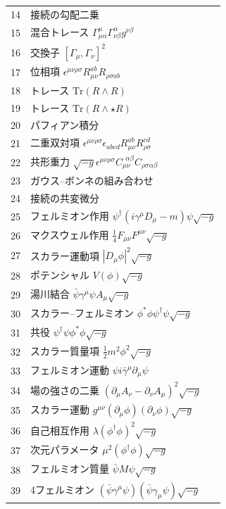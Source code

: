 \documentclass[13pt,a4paper]{ltjsarticle}
\begin{document}
\begin{longtable}{r l}
		14 & 接続の勾配二乗 \\
		15 & 混合トレース \(\Gamma^{\mu}_{\mu\alpha}\Gamma^{\alpha}_{\nu\beta}g^{\nu\beta}\) \\
		16 & 交換子 \([\Gamma_\mu, \Gamma_\nu]^2\) \\
		17 & 位相項 \(\epsilon^{\mu\nu\rho\sigma}R_{\mu\nu}^{ab}R_{\rho\sigma ab}\) \\
		18 & トレース \(\mathrm{Tr}(R\wedge R)\) \\
		19 & トレース \(\mathrm{Tr}(R\wedge\star R)\) \\
		20 & パフィアン積分 \\
		21 & 二重双対項 \(\epsilon^{\mu\nu\rho\sigma}\epsilon_{abcd}R_{\mu\nu}^{ab}R_{\rho\sigma}^{cd}\) \\
		22 & 共形重力 \(\sqrt{-g}\epsilon^{\mu\nu\rho\sigma}C_{\mu\nu}^{\ \ \alpha\beta}C_{\rho\sigma\alpha\beta}\) \\
		23 & ガウス–ボンネの組み合わせ \\
		24 & 接続の共変微分 \\
		25 & フェルミオン作用 \(\psi^\dagger(i\gamma^\mu D_\mu - m)\psi\sqrt{-g}\) \\
		26 & マクスウェル作用 \(\frac{1}{4}F_{\mu\nu}F^{\mu\nu}\sqrt{-g}\) \\
		27 & スカラー運動項 \(|D_\mu\phi|^2\sqrt{-g}\) \\
		28 & ポテンシャル \(V(\phi)\sqrt{-g}\) \\
		29 & 湯川結合 \(\bar{\psi}\gamma^\mu\psi A_\mu\sqrt{-g}\) \\
		30 & スカラー–フェルミオン \(\phi^*\phi\psi^\dagger\psi\sqrt{-g}\) \\
		31 & 共役 \(\psi^\dagger\psi\phi^*\phi\sqrt{-g}\) \\
		32 & スカラー質量項 \(\frac{1}{2}m^2\phi^2\sqrt{-g}\) \\
		33 & フェルミオン運動 \(\psi i\bar{\gamma}^\mu\partial_\mu\psi\) \\
		34 & 場の強さの二乗 \((\partial_\mu A_\nu - \partial_\nu A_\mu)^2\sqrt{-g}\) \\
		35 & スカラー運動 \(g^{\mu\nu}(\partial_\mu\phi)(\partial_\nu\phi)\sqrt{-g}\) \\
		36 & 自己相互作用 \(\lambda(\phi^\dagger\phi)^2\sqrt{-g}\) \\
		37 & 次元パラメータ \(\mu^2(\phi^\dagger\phi)\sqrt{-g}\) \\
		38 & フェルミオン質量 \(\bar{\psi}M\psi\sqrt{-g}\) \\
		39 & 4フェルミオン \((\bar{\psi}\gamma^\mu\psi)(\bar{\psi}\gamma_\mu\psi)\sqrt{-g}\) \\

\end{longtable}
\end{document}
